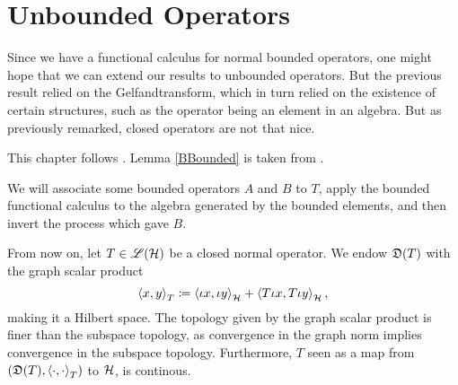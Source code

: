 \section{Unbounded Operators}



Since we have a functional calculus for normal bounded operators, one might hope 
that we can extend our results to unbounded operators. But the previous 
result relied on the Gelfandtransform, which in turn relied on the existence
of certain structures, such as the operator being an element in an algebra. 
But as previously remarked, closed operators are not that nice.

This chapter follows \cite{LesHaupt}. Lemma \ref{BBounded} is taken from 
\cite[p. 319]{ConFuncAna}.

We will
 associate some bounded operators $A$ and  $B$ to $T$, apply the bounded functional
calculus to the algebra generated by the bounded elements,
and then invert the process which gave $B$.

From now on, let $T \in \mathscr{L}(\mathcal{H})$ be a closed normal operator. 
We endow $\mathfrak{D}(T)$ with the graph scalar product
\[
 \left\langle x,y \right\rangle_T \coloneqq  \left\langle \iota x, \iota y \right\rangle_{\mathcal{H}} +
 \left\langle  T \iota x, T \iota y \right\rangle_{\mathcal{H}},
\]
making it a Hilbert space. The topology given by the graph scalar product
is finer than the subspace topology, as convergence in the graph norm
 implies convergence in the subspace topology. Furthermore,
$T$ seen as a map from $( \mathfrak{D}(T) , \left\langle \cdot, \cdot \right\rangle_T)$ to $\mathcal{H}$, is 
continous.

